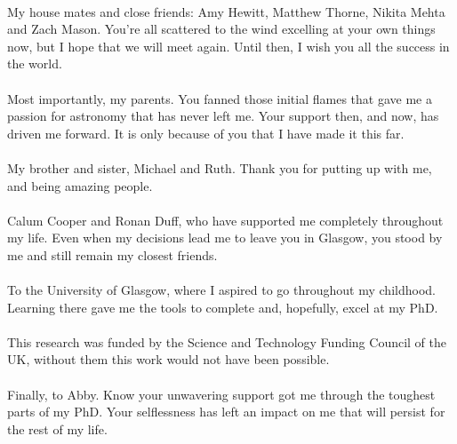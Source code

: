\begin{acknowledgements}
\\
My house mates and close friends: Amy Hewitt, Matthew Thorne, Nikita Mehta and Zach Mason. You're all scattered to the wind excelling at your own things now, but I hope that we will meet again. Until then, I wish you all the success in the world.
\\
\\
Most importantly, my parents. You fanned those initial flames that gave me a passion for astronomy that has never left me. Your support then, and now, has driven me forward. It is only because of you that I have made it this far.
\\
\\
My brother and sister, Michael and Ruth. Thank you for putting up with me, and being amazing people.
\\
\\
Calum Cooper and Ronan Duff, who have supported me completely throughout my life. Even when my decisions lead me to leave you in Glasgow, you stood by me and still remain my closest friends.
\\
\\
To the University of Glasgow, where I aspired to go throughout my childhood. Learning there gave me the tools to complete and, hopefully, excel at my PhD.
\\
\\
This research was funded by the Science and Technology Funding Council of the UK, without them this work would not have been possible.
\\
\\
Finally, to Abby. Know your unwavering support got me through the toughest parts of my PhD. Your selflessness has left an impact on me that will persist for the rest of my life.

\end{acknowledgements}

